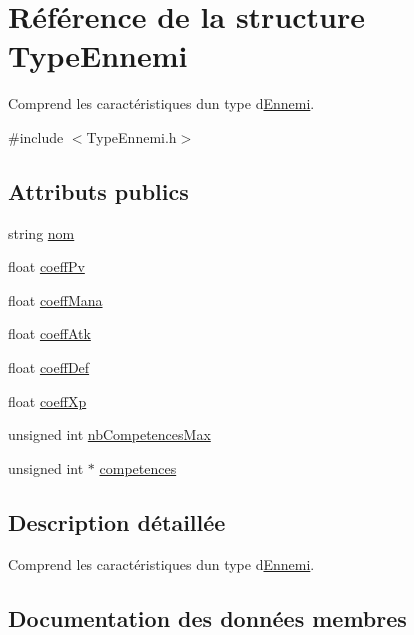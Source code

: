 \hypertarget{structTypeEnnemi}{}\section{Référence de la structure Type\+Ennemi}
\label{structTypeEnnemi}


Comprend les caractéristiques d\textquotesingle{}un type d\textquotesingle{}\mbox{\hyperlink{classEnnemi}{Ennemi}}.  




{\ttfamily \#include $<$Type\+Ennemi.\+h$>$}

\subsection*{Attributs publics}
\begin{DoxyCompactItemize}
\item 
string \mbox{\hyperlink{structTypeEnnemi_ad74acff484556a90aeb2d7337bab02bb}{nom}}
\item 
float \mbox{\hyperlink{structTypeEnnemi_a88cb0d5fa7e38e1de0f769eabe1a7594}{coeff\+Pv}}
\item 
float \mbox{\hyperlink{structTypeEnnemi_af7beb579213913c0012b3d0ad670a944}{coeff\+Mana}}
\item 
float \mbox{\hyperlink{structTypeEnnemi_a0d2fed6410bc352e29229ae354270a0b}{coeff\+Atk}}
\item 
float \mbox{\hyperlink{structTypeEnnemi_a7621d916e93ef786b6dfcb46dfad61d4}{coeff\+Def}}
\item 
float \mbox{\hyperlink{structTypeEnnemi_ab16b72a14f6969108c2bc3a5d59aba26}{coeff\+Xp}}
\item 
unsigned int \mbox{\hyperlink{structTypeEnnemi_a0123477dfc546083851d78214c947862}{nb\+Competences\+Max}}
\item 
unsigned int $\ast$ \mbox{\hyperlink{structTypeEnnemi_a701fbe7be31f5ca8f8850cf7b0de17ef}{competences}}
\end{DoxyCompactItemize}


\subsection{Description détaillée}
Comprend les caractéristiques d\textquotesingle{}un type d\textquotesingle{}\mbox{\hyperlink{classEnnemi}{Ennemi}}. 

\subsection{Documentation des données membres}
\mbox{\label{structTypeEnnemi_a0d2fed6410bc352e29229ae354270a0b}} 
